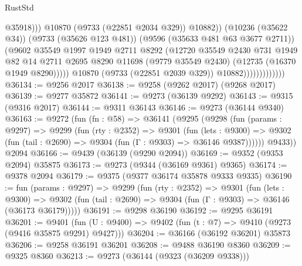 \begin{lexlean}{RustStd}
\begin{coremodule}
                                          @35918)))
                                    @10870
                                    (@9733 (@22851 @2034 @329))
                                    @10882))
                                (@10236 (@35622 @34))
                                (@9733 (@35626 @123 @481))
                                (@9596 (@35633 @481 @63 @3677 @2711))
                                (@9602
                                  @35549
                                  @1997
                                  @1949
                                  @2711
                                  @8292
                                  (@12720
                                    @35549
                                    @2430
                                    @731
                                    @1949
                                    @82
                                    @14
                                    @2711
                                    @2695
                                    @8290
                                    @11698
                                    (@9779 @35549 @2430)
                                    (@12735 (@16370 @1949 @8290)))))
                              @10870
                              (@9733 (@22851 @2039 @329))
                              @10882)))))))))))))
@36134 := @9256 @2017
@36138 := @9258 (@9262 @2017) (@9268 @2017)
@36139 := @9277 @35872
@36141 := @9273 (@36139 @9292)
@36143 := @9315 (@9316 @2017)
@36144 := @9311 @36143
@36146 := @9273 (@36144 @9340)
@36163 := @9272
    (fun (fn : @58) =>
    @36141
      (@9295
        (@9298
          (fun (params : @9297) =>
          @9299
            (fun (rty : @2352) =>
            @9301
              (fun (lets : @9300) =>
              @9302 (fun (tail : @2690) => @9304 (fun (Γ : @9303) => @36146 @9387))))))
        @9433))
    @2094
@36166 := @9439 (@36139 (@9290 @2094))
@36169 := @9352 (@9353 @2094) @35875
@36173 := @9273 (@9344 (@36169 @9361) @9365)
@36174 := @9378 @2094
@36179 := @9375 (@9377 @36174 @35878 @9333 @9335)
@36190 := fun (params : @9297) =>
  @9299
    (fun (rty : @2352) =>
    @9301
      (fun (lets : @9300) =>
      @9302 (fun (tail : @2690) => @9304 (fun (Γ : @9303) => @36146 (@36173 @36179)))))
@36191 := @9298 @36190
@36192 := @9295 @36191
@36201 := @9401
    (fun (U : @9400) => @9402 (fun (t : @7) => @9410 (@9273 (@9416 @35875 @9291) @9427)))
@36204 := @36166 (@36192 @36201) @35873
@36206 := @9258 @36191 @36201
@36208 := @9488 @36190 @8360
@36209 := @9325 @8360
@36213 := @9273 (@36144 (@9323 (@36209 @9338)))

\end{coremodule}
\end{lexlean}
